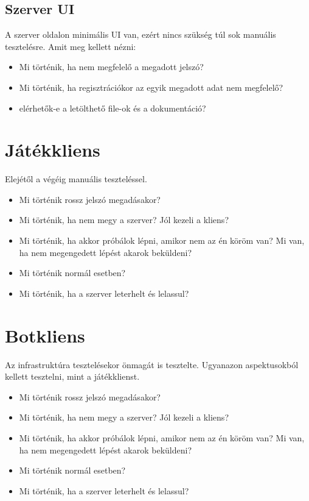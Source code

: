 \documentclass[twoside, a4paper, 12pt]{book}
\begin{document}
\subsection{Szerver UI}
A szerver oldalon minimális UI van, ezért nincs szükség túl sok manuális tesztelésre. Amit meg kellett nézni:
\begin{itemize}
	\item Mi történik, ha nem megfelelő a megadott jelszó?
	\item Mi történik, ha regisztrációkor az egyik megadott adat nem megfelelő?
	\item elérhetők-e a letölthető file-ok és a dokumentáció?
\end{itemize}

\section{Játékkliens}
Elejétől a végéig manuális teszteléssel.
\begin{itemize}
	\item Mi történik rossz jelszó megadásakor?
	\item Mi történik, ha nem megy a szerver? Jól kezeli a kliens?
	\item Mi történik, ha akkor próbálok lépni, amikor nem az én köröm van? Mi van, ha nem megengedett lépést akarok beküldeni?
	\item Mi történik normál esetben?
	\item Mi történik, ha a szerver leterhelt és lelassul?
\end{itemize}


\section{Botkliens}
Az infrastruktúra tesztelésekor önmagát is tesztelte. Ugyanazon aspektusokból kellett tesztelni, mint a játékklienst.
\begin{itemize}
	\item Mi történik rossz jelszó megadásakor?
	\item Mi történik, ha nem megy a szerver? Jól kezeli a kliens?
	\item Mi történik, ha akkor próbálok lépni, amikor nem az én köröm van? Mi van, ha nem megengedett lépést akarok beküldeni?
	\item Mi történik normál esetben?
	\item Mi történik, ha a szerver leterhelt és lelassul?
\end{itemize}
\end{document}

